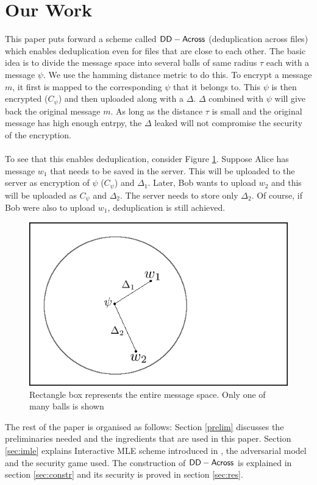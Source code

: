 \section{Our Work}
\label{sec:intro}
This paper puts forward a scheme called $\mathsf{DD-Across}$ (deduplication across files) which enables deduplication even for files that are close to
each other. The basic idea is to divide the message space into several balls of same radius $\tau$
each with a message $\psi$. We use the hamming distance metric to do this. To encrypt a 
message $m$, it first is mapped to the corresponding $\psi$ that it belongs to. This $\psi$ is then
encrypted ($C_\psi$) and then uploaded along with a $\Delta$. $\Delta$ combined with $\psi$ will give
back the original message $m$. As long as the distance $\tau$ is small and the original
message has high enough entrpy, the $\Delta$ leaked will not compromise the security of the
encryption.\\ \\
To see that this enables deduplication, consider Figure \ref{fig:example}. Suppose Alice has
message $w_1$ that needs to be saved in the server. This will be uploaded to the server 
as encryption of $\psi$ ($C_\psi$) and $\Delta_1$. Later, Bob wants to upload $w_2$ and this
will be uploaded as $C_\psi$ and $\Delta_2$. The server needs to store only $\Delta_2$. Of course,
if Bob were also to upload $w_1$, deduplication is still achieved.

\begin{figure}[H]
	\includegraphics[scale=0.5]{example.png}
	\caption{Rectangle box represents the entire message space. Only one of many balls is shown}
	\label{fig:example}
\end{figure}



The rest of the paper is organised as follows: Section \ref{prelim} discusses the preliminaries needed 
and the ingredients that are used in this paper. Section \ref{sec:imle} explains Interactive MLE scheme
introduced in \cite{imle}, the adversarial model and the security game used. The construction of $\mathsf{DD-Across}$
is explained in section \ref{sec:constr} and its security is proved in section \ref{sec:res}.